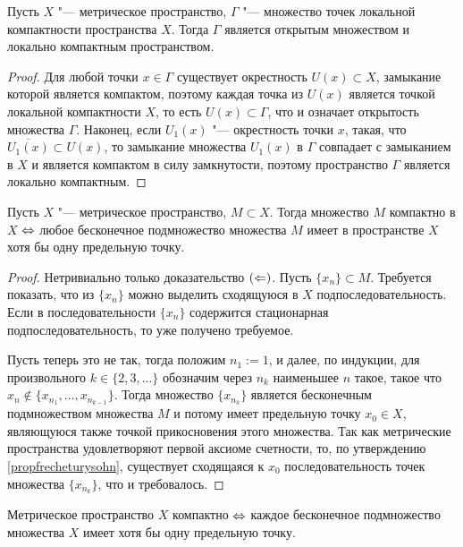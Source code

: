 \begin{theorem}
    Пусть $X$ "--- метрическое пространство, $\Gamma$ "--- множество точек локальной компактности пространства $X$. Тогда $\Gamma$ является открытым множеством и локально компактным пространством.
\end{theorem}

\begin{proof}
    Для любой точки $x \in \Gamma$ существует окрестность $U(x) \subset X$, замыкание которой является компактом, поэтому каждая точка из $U(x)$ является точкой локальной компактности $X$, то есть $U(x) \subset \Gamma$, что и означает открытость множества $\Gamma$. Наконец, если $U_1(x)$ "--- окрестность точки $x$, такая, что $\overline{U_1(x)} \subset U(x)$, то замыкание множества $U_1(x)$ в $\Gamma$ совпадает с замыканием в $X$ и является компактом в силу замкнутости, поэтому пространство $\Gamma$ является локально компактным.
\end{proof}

\begin{theorem}
    Пусть $X$ "--- метрическое пространство, $M\subset X$. Тогда множество $M$ компактно в $X$ $\Leftrightarrow$ любое бесконечное подмножество множества $M$ имеет в пространстве $X$ хотя бы одну предельную точку.
\end{theorem}

\begin{proof}
    Нетривиально только доказательство $(\Leftarrow)$. Пусть $\{x_n\} \subset M$. Требуется показать, что из $\{x_n\}$ можно выделить сходящуюся в $X$ подпоследовательность. Если в последовательности $\{x_n\}$ содержится стационарная подпоследовательность, то уже получено требуемое.
    
    Пусть теперь это не так, тогда положим $n_1 := 1$, и далее, по индукции, для произвольного $k \in \{2, 3, \dotsc\}$ обозначим через $n_k$ наименьшее $n$ такое, такое что $x_n \not\in \{x_{n_1}, \dotsc, x_{n_{k-1}}\}$. Тогда множество $\{x_{n_k}\}$ является бесконечным подмножеством множества $M$ и потому имеет предельную точку $x_0 \in X$, являющуюся также точкой прикосновения этого множества. Так как метрические пространства удовлетворяют первой аксиоме счетности, то, по утверждению \ref{propfrecheturysohn}, существует сходящаяся к $x_0$ последовательность точек множества $\{x_{n_k}\}$, что и требовалось.
\end{proof}

\begin{corollary}
    Метрическое пространство $X$ компактно $\Leftrightarrow$ каждое бесконечное подмножество множества $X$ имеет хотя бы одну предельную точку.
\end{corollary}

